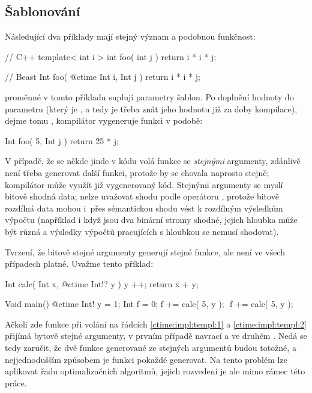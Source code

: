 \subsection{Šablonování}
Následující dva příklady mají stejný význam a podobnou funkčnost:
\begin{cppcode}
// C++
template< int i >
int foo( int j ) {
	return i * i * j;
}
\end{cppcode}

\begin{code}
// Beast
Int foo( @ctime Int i, Int j ) {
	return i * i * j;
}
\end{code}

\ctime proměnné v tomto příkladu suplují parametry šablon. Po doplnění hodnoty do parametru  (který je \ctime, a tedy je třeba znát jeho hodnotu již za doby kompilace), dejme tomu , kompilátor vygeneruje funkci v podobě:

\begin{code}
Int foo( 5, Int j ) {
	return 25 * j;
}
\end{code}

V případě, že se někde jinde v kódu volá funkce  se \textit{stejnými} \ctime argumenty, zdánlivě není třeba generovat další funkci, protože by se chovala naprosto stejně; kompilátor může využít již vygenerovaný kód. Stejnými \ctime argumenty se myslí bitově shodná data; nelze uvažovat shodu podle operátoru \inlineCode{==}, protože bitově rozdílná data mohou i~přes sémantickou shodu vést k rozdílným výsledkům výpočtu (například i když jsou dva binární stromy shodné, jejich hloubka může být různá a výsledky výpočtů pracujících s hloubkou se nemusí shodovat).

Tvrzení, že bitově stejné \ctime argumenty generují stejné funkce, ale není ve všech případech platné. Uvažme tento příklad:
\begin{code}
Int calc( Int x, @ctime Int!? y ) {
	y ++;
	return x + y;
}

Void main() {
	@ctime Int! y = 1;
	Int f = 0;
	f += calc( 5, y ); $\label{ctime:impl:templ:1}$
	f += calc( 5, y ); $\label{ctime:impl:templ:2}$
}
\end{code}

Ačkoli zde funkce  při volání na řádcích \ref{ctime:impl:templ:1} a \ref{ctime:impl:templ:2} přijímá bytově stejné \ctime argumenty, v prvním případě navrací  a ve druhém . Nedá se tedy zaručit, že dvě funkce generované ze stejných \ctime argumentů budou totožné, a nejjednodušším způsobem je funkci pokaždé generovat. Na tento problém lze aplikovat řadu optimalizačních algoritmů, jejich rozvedení je ale mimo rámec této práce.

